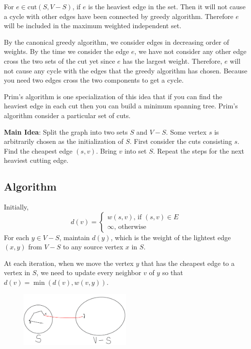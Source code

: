 \begin{claim}
	For $e \in \text{cut}(S, V-S)$, if $e$ is the heaviest edge in the set. Then it will not cause a cycle with other edges have been connected by greedy algorithm. Therefore $e$ will be included in the maximum weighted independent set.
\end{claim}
\begin{claimproof}
	By the canonical greedy algorithm, we consider edges in decreasing order of weights. By the time we consider the edge $e$, we have not consider any other edge cross the two sets of the cut yet since $e$ has the largest weight. Therefore, $e$ will not cause any cycle with the edges that the greedy algorithm has chosen. Because you need two edges cross the two components to get a cycle.
\end{claimproof}

Prim's algorithm is one specialization of this idea that if you can find the heaviest edge in each cut then you can build a minimum spanning tree. Prim's algorithm consider a particular set of cuts.

\textbf{Main Idea}: Split the graph into two sets $S$ and $V-S$. Some vertex $s$ is arbitrarily chosen as the initialization of $S$. First consider the cuts consisting $s$. Find the cheapest edge $(s, v)$. Bring $v$ into set $S$. Repeat the steps for the next heaviest cutting edge.

\subsection{Algorithm}
Initially, 
\[
d(v) = 
\begin{cases}
w(s, v) \text{, if $(s,v) \in E$}\\
\infty \text{, otherwise}
\end{cases}
\]
For each $ y \in V-S $, maintain $ d(y) $, which is the weight of the lightest edge $(x, y)$ from $V-S$ to any source vertex $x$ in $S$.

At each iteration, when we move the vertex $y$ that has the cheapest
edge to a vertex in $S$, we need to update every neighbor $v$ of $y$ so that $ d(v) = \min(d(v), w(v, y)) $.
\begin{figure}[H]
	\centering
	\includegraphics[width=0.5\textwidth]{prim.png}
\end{figure}

